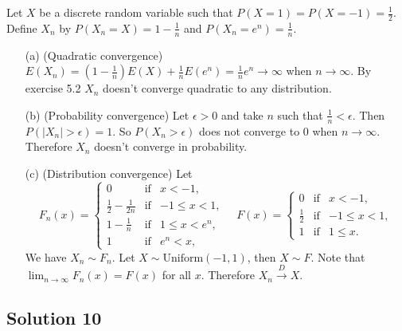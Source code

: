 Let $X$ be a discrete random variable such that $P(X = 1) = P(X = -1) = \frac{1}{2}$.
Define $X_n$ by $P(X_n = X) = 1 - \frac{1}{n}$ and $P(X_n = e^n) = \frac{1}{n}$.
\begin{itemize}
    \item[(a)] (Quadratic convergence)
        $E(X_n) = (1 - \frac{1}{n}) E(X) + \frac{1}{n} E(e^n) = \frac{1}{n}e^n \to \infty$ when $n \to \infty$.
        By exercise 5.2 $X_n$ doesn't converge quadratic to any distribution.
    \item[(b)] (Probability convergence)
        Let $\epsilon > 0$ and take $n$ such that $\frac{1}{n} < \epsilon$.
        Then $P(|X_n| > \epsilon) = 1$.
        So $P(X_n > \epsilon)$ does not converge to $0$ when $n \to \infty$.
        Therefore $X_n$ doesn't converge in probability.
    \item[(c)] (Distribution convergence)
        Let
        \begin{equation*}
            F_n(x) = \left\{ \begin{array}{lll}
                0 & \textrm{if} & x < -1, \\
                \frac{1}{2} - \frac{1}{2n} & \textrm{if} & -1 \leq x < 1, \\
                1 - \frac{1}{n} & \textrm{if} & 1 \leq x < e^n, \\
                1 & \textrm{if} & e^n < x,
            \end{array} \right.
            \quad
            F(x) = \left\{ \begin{array}{lll}
                0 & \textrm{if} & x < -1, \\
                \frac{1}{2} & \textrm{if} & -1 \leq x < 1, \\
                1 & \textrm{if} & 1 \leq x.
            \end{array} \right.
        \end{equation*}
        We have $X_n \sim F_n$.
        Let $X \sim \mathrm{Uniform}(-1, 1)$, then $X \sim F$.
        Note that $\lim_{n \to \infty} F_n(x) = F(x)$ for all $x$.
        Therefore $X_n \xrightarrow{D} X$.
\end{itemize}


\subsection*{Solution 10}

